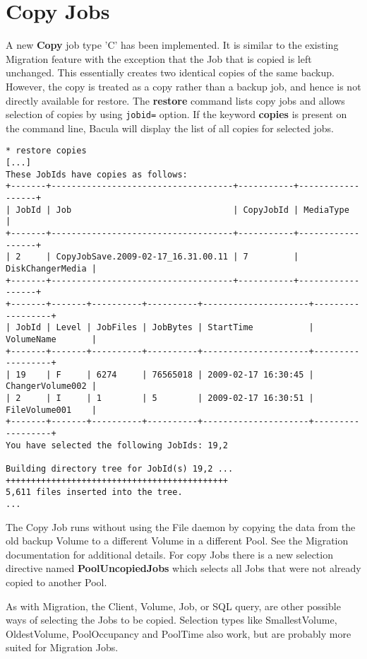 \section{Copy Jobs}

A new {\bf Copy} job type 'C' has been implemented. It is similar to the
existing Migration feature with the exception that the Job that is copied is
left unchanged.  This essentially creates two identical copies of the same
backup. However, the copy is treated as a copy rather than a backup job, and
hence is not directly available for restore.  The {\bf restore} command lists
copy jobs and allows selection of copies by using \texttt{jobid=}
option. If the keyword {\bf copies} is present on the command line, Bacula will
display the list of all copies for selected jobs.

\begin{verbatim}
* restore copies
[...]
These JobIds have copies as follows:
+-------+------------------------------------+-----------+------------------+
| JobId | Job                                | CopyJobId | MediaType        |
+-------+------------------------------------+-----------+------------------+
| 2     | CopyJobSave.2009-02-17_16.31.00.11 | 7         | DiskChangerMedia |
+-------+------------------------------------+-----------+------------------+
+-------+-------+----------+----------+---------------------+------------------+
| JobId | Level | JobFiles | JobBytes | StartTime           | VolumeName       |
+-------+-------+----------+----------+---------------------+------------------+
| 19    | F     | 6274     | 76565018 | 2009-02-17 16:30:45 | ChangerVolume002 |
| 2     | I     | 1        | 5        | 2009-02-17 16:30:51 | FileVolume001    |
+-------+-------+----------+----------+---------------------+------------------+
You have selected the following JobIds: 19,2

Building directory tree for JobId(s) 19,2 ...  ++++++++++++++++++++++++++++++++++++++++++++
5,611 files inserted into the tree.
...
\end{verbatim}


The Copy Job runs without using the File daemon by copying the data from the
old backup Volume to a different Volume in a different Pool. See the Migration
documentation for additional details. For copy Jobs there is a new selection
directive named {\bf PoolUncopiedJobs} which selects all Jobs that were
not already copied to another Pool. 

As with Migration, the Client, Volume, Job, or SQL query, are
other possible ways of selecting the Jobs to be copied. Selection
types like SmallestVolume, OldestVolume, PoolOccupancy and PoolTime also
work, but are probably more suited for Migration Jobs. 

